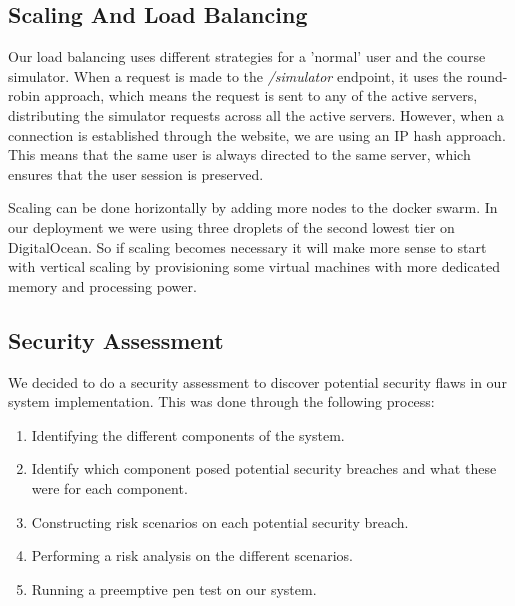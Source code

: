 

\subsection{Scaling And Load Balancing}
Our load balancing uses different strategies for a 'normal' user and the course simulator. When a request is made to the \textit{/simulator} endpoint, it uses the round-robin approach, which means the request is sent to any of the active servers, distributing the simulator requests across all the active servers. However, when a connection is established through the website, we are using an IP hash approach. This means that the same user is always directed to the same server, which ensures that the user session is preserved.

Scaling can be done horizontally by adding more nodes to the docker swarm. In our deployment we were using three droplets of the second lowest tier on DigitalOcean. So if scaling becomes necessary it will make more sense to start with vertical scaling by provisioning some virtual machines with more dedicated memory and processing power.

\subsection{Security Assessment}
We decided to do a security assessment to discover potential security flaws in our system implementation. This was done through the following process: 
\begin{enumerate}
    \item Identifying the different components of the system.
    \item Identify which component posed potential security breaches and what these were for each component.
    \item Constructing risk scenarios on each potential security breach.
    \item Performing a risk analysis on the different scenarios.
    \item Running a preemptive pen test on our system.
\end{enumerate}

